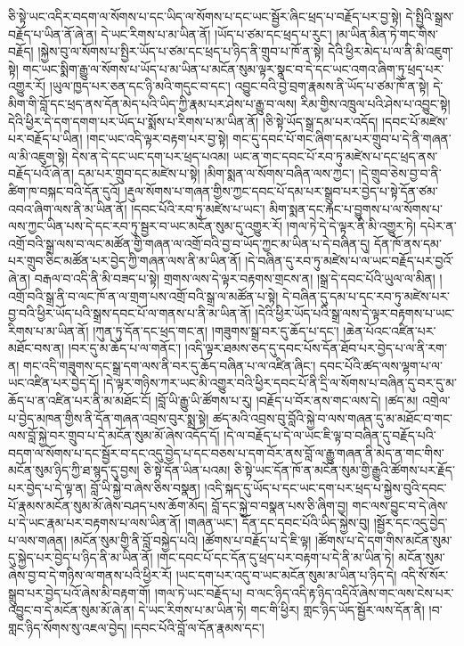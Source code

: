 ཅི་སྟེ་ཡང་འདིར་བདག་ལ་སོགས་པ་དང་ཡིད་ལ་སོགས་པ་དང་ཡང་སྦྱོར་ཞིང་ཕྲད་པ་བརྗོད་པར་བྱ་སྟེ། དེ་སྤྱིའི་སྒྲས་བརྗོད་པ་ཡིན་ནོ་ཞེ་ན། དེ་ཡང་རིགས་པ་མ་ཡིན་ནོ། །ཡོད་པ་ཙམ་དང་ཕྲད་པ་རུང་། །མ་ཡིན་མིན་ཏེ་གང་གིས་བརྗོད། །སྐྱེས་བུ་ལ་སོགས་པ་སྤྱིར་ཡོད་པ་ཙམ་དང་ཕྲད་པ་ཉིད་ནི་གྲུབ་པ་ཁོ་ན་སྟེ། དེའི་ཕྱིར་མེད་པ་ལ་ནི་མི་འཇུག་སྟེ། གང་ཡང་སྨིག་རྒྱུ་ལ་སོགས་པ་ཡོད་པ་མ་ཡིན་པ་མངོན་སུམ་ལྟར་སྣང་བ་དེ་དང་ཡང་འགའ་ཞིག་ཏུ་ཕྲད་པར་འགྱུར་རོ། །ཡུལ་ཁྱད་པར་ཅན་དང་ཉི་མའི་གདུང་བ་དང་། འབྱུང་བའི་བྱེ་བྲག་རྣམས་ནི་ཡོད་པ་ཙམ་ཁོ་ན་སྟེ། དེ་མིག་གི་བློ་དང་ཕྲད་ནས་དོན་མེད་པའི་ཡིད་ཀྱི་རྣམ་པར་ཤེས་པ་རྒྱུ་བ་ལས། རིམ་གྱིས་འཁྲུལ་པའི་ཤེས་པ་འབྱུང་སྟེ། དེའི་ཕྱིར་དེ་དག་དགག་པར་ཡོད་པ་སྨོས་པ་རིགས་པ་མ་ཡིན་ནོ། །ཅི་སྟེ་ཡོད་སྒྲ་དམ་པར་འདོད། །དབང་པོ་མཛེས་པར་བརྗོད་པ་ཡིན། །གང་ཡང་འདི་ལྟར་བརྟག་པར་བྱ་སྟེ། གང་དུ་དབང་པོ་གང་ཞིག་དམ་པར་གྲུབ་པ་དེ་ནི་གཞན་ལ་མི་འཇུག་སྟེ། དེས་ན་དེ་དང་ཡང་དག་པར་ཕྲད་པའམ། ཡང་ན་གང་དབང་པོ་རབ་ཏུ་མཛེས་པ་དང་ཕྲད་ནས་བརྗོད་པའོ་ཞེ་ན། དམ་པར་གྲུབ་དང་མཛེས་པ་སྟེ། །མིག་སྨན་ལ་སོགས་བཞིན་ལས་ཀྱང་། །དེ་གྲུབ་ཅེས་བྱ་བ་ནི་ཚིག་ཁ་བསྐང་བའི་དོན་དུའོ། །རྡུལ་སོགས་པ་གཞན་གྱིས་ཀྱང་དབང་པོ་དམ་པར་སྒྲུབ་པར་བྱེད་པ་སྟེ་དོན་ཙམ་འབའ་ཞིག་ལས་ནི་མ་ཡིན་ནོ། །དབང་པོའི་རབ་ཏུ་མཛེས་པ་ཡང་། མིག་སྨན་དང་རྐང་པ་བྱུགས་པ་ལ་སོགས་པ་ལས་ཀྱང་ཡིན་པས་དེ་དང་རབ་ཏུ་སྦྱར་བ་ཡང་མངོན་སུམ་དུ་འགྱུར་རོ། །གལ་ཏེ་དེ་དེ་ལྟར་ནི་མི་འགྱུར་ཏེ། དཔེར་ན་འགྲོ་བའི་སྒྲ་ལས་བ་ལང་མཚོན་གྱི་གཞན་ལ་འགྲོ་བའི་བྱ་བ་ཡོད་ཀྱང་མ་ཡིན་པ་དེ་བཞིན་དུ། དོན་ཁོ་ནས་དམ་པར་གྲུབ་ཅིང་མཚོན་པར་བྱེད་ཀྱི་གཞན་ལས་ནི་མ་ཡིན་ནོ། །དེ་བཞིན་དུ་རབ་ཏུ་མཛེས་པ་ལ་ཡང་བརྗོད་པར་བྱའོ་ཞེ་ན། བརྒལ་བ་འདི་ནི་མི་བཟད་པ་སྟེ། གྲགས་ལས་དེ་ལྟར་བརྟགས་གྲངས་ན། །སྒྲ་དེ་དབང་པོའི་ཡུལ་ལ་མིན། །འགྲོ་བའི་སྒྲ་ནི་བ་ལང་ཁོ་ན་ལ་གྲག་པས་འགྲོ་བའི་སྒྲ་ལ་མཚོན་པ་སྟེ། དེ་བཞིན་དུ་དམ་པ་དང་རབ་ཏུ་མཛེས་པར་བྱ་བའི་ཕྱིར་ཡོད་པའི་སྒྲས་དབང་པོ་ལ་གནས་པ་ནི་མ་ཡིན་ནོ། །དེའི་ཕྱིར་ཡོད་པའི་སྒྲ་ལས་དེ་ལྟར་བརྟགས་པ་ཡང་རིགས་པ་མ་ཡིན་ནོ། །ཀུན་ཏུ་དོན་དང་ཕྲད་གང་ན། །གཟུགས་སྒྲ་བར་དུ་ཆོད་པ་དང་། །ཆེན་པོའང་འཛིན་པར་མཐོང་བས་ན། །བར་དུ་མ་ཆོད་པ་ལ་གནོང་། །འདི་ལྟར་ཐམས་ཅད་དུ་དབང་པོས་དོན་ཐོབ་པར་བྱེད་པ་ལ་ནི་རག་ན། གང་འདི་གཟུགས་དང་སྒྲ་དག་ལས་ནི་བར་དུ་ཆོད་བཞིན་པ་ལ་འཛིན་ཞིང་། དབང་པོའི་ཚད་ལས་ལྷག་པ་ལ་ཡང་འཛིན་པར་བྱེད་དོ། །དེ་ལྟར་གཉིས་ཀར་ཡང་མི་འགྱུར་བའི་ཕྱིར་དབང་པོ་ནི་དྲི་ལ་སོགས་པ་བཞིན་དུ་བར་དུ་མ་ཆོད་པ་ན་འཛིན་པར་ནི་མ་མཐོང་ངོ། །བློ་ཡི་རྒྱུ་ཡི་ཚོགས་པ་རུ། །བརྗོད་པ་བོར་ནས་གང་ལས་དེ། །ཚད་མ། འགྲེལ་པ་བྱེད་མཁན་གྱིས་ནི་དོན་གཞན་འབྲས་བུར་སྨྲ་སྟེ། ཚད་མའི་འབྲས་བུ་བློའི་སྐྱེ་བ་ལས་གཞན་དུ་མ་མཐོང་བ་གང་ལས་བློ་སྐྱེ་བར་གྲུབ་པ་དེ་མངོན་སུམ་མོ་ཞེས་འདོད་དོ། །དེ་ལ་བརྗོད་པ་དེ་ལ་ཡང་ཇི་ལྟ་བ་བཞིན་དུ་བརྗོད་པའི་བདག་ལ་སོགས་པ་དང་སྦྱོར་བ་དང་འདུ་བྱེད་པ་དང་བཅས་པ་དག་བོར་ནས་བློ་ལ་རྒྱུ་གཞན་ནི་མེད་ན་གང་གིས་མངོན་སུམ་ཉིད་ཀྱི་ཐ་སྙད་དུ་བྱས། ཅི་སྟེ་དོན་ཡིན་པའམ། ཅི་སྟེ་ཡང་དོན་ཁོ་ན་མངོན་སུམ་གྱི་རྒྱུའི་ཚོགས་པར་རྗོད་པར་བྱེད་པ་དེ་ལྟ་ན། བློ་ཡི་སྐྱེ་བ་ཞེས་ཅིས་བསྣན། །འདི་སྐད་དུ་ཡོད་པ་དང་ཡང་དག་པར་ཕྲད་པ་སྐྱེས་བུའི་དབང་པོ་རྣམས་མངོན་སུམ་མོ་ཞེས་བཤད་པས་ཆོག་མོད། བློ་དང་སྐྱེ་བ་བསྣན་པས་ཅི་ཞིག་བྱ། གང་ལས་བྱུང་བ་དེ་ཞེས་པ་དེ་ཡང་རྣམ་པར་བརྟགས་པ་ལས་ཡིན་ནོ། །གཞན་ཡང་། དོན་དང་དབང་པོའི་ཡིད་སྐྱེས་བུ། །སྦྱོར་དང་འདུ་བྱེད་པ་ལས་གཞན། །མངོན་སུམ་གྱི་ནི་བློ་བསྐྱེད་པའི། །ཚོགས་པ་བརྗོད་པ་དེ་ཇི་ལྟ། །ཚོགས་པ་དེ་དག་གིས་མངོན་སུམ་དུ་སྐྱེད་པར་བྱེད་པ་ཉིད་ནི་མ་ཡིན་ནོ། །གང་དབང་པོ་དང་དོན་དུ་ཕྲད་པར་བརྟག་པ་དེ་ནི་མ་ཡིན་ཏེ། མངོན་སུམ་ཞེས་བྱ་བ་དེ་གཉིས་ལ་གནས་པའི་ཕྱིར་རོ། །ཡང་དག་པར་འདུ་བ་ཡང་མངོན་སུམ་མ་ཡིན་པ་ཉིད་དེ། འདི་སོ་སོར་སྒྲུབ་པར་བྱེད་པའོ་ཞེས་མི་བརྟག་གོ། །གལ་ཏེ་ཡང་བརྗོད་པ། བ་ལང་ཉིད་འདི་རྟ་ཉིད་འདིའོ་ཞེས་གང་ལས་ངེས་པར་འབྱུང་བ་དེ་མངོན་སུམ་མོ་ཞེ་ན། དེ་ཡང་རིགས་པ་མ་ཡིན་ཏེ། གང་གི་ཕྱིར། གླང་ཉིད་ཡོད་སྦྱོར་ལས་དོན་ནི། །བ་གླང་ཉིད་སོགས་སུ་འཇལ་བྱེད། །དབང་པོའི་བློ་ལ་དོན་རྣམས་དང་། 